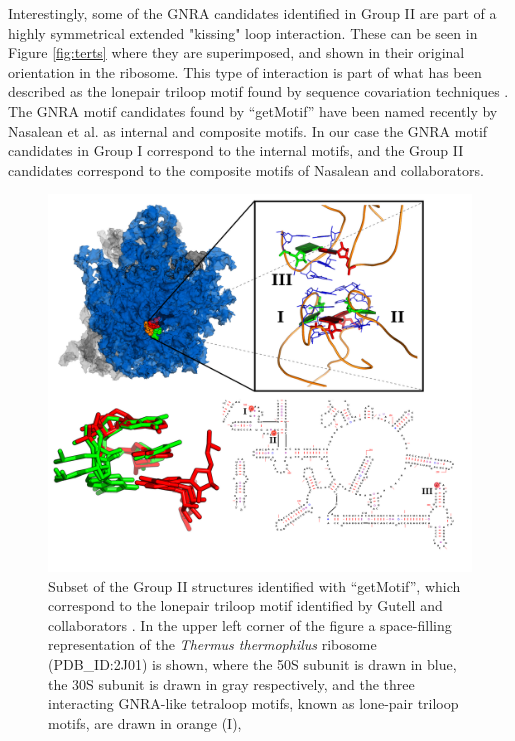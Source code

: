 Interestingly, some of  the GNRA candidates identified in  Group II are
part    of   a    highly   symmetrical    extended    "kissing"   loop
interaction. These  can be seen  in Figure \ref{fig:terts}  where they
are  superimposed, and  shown  in their  original  orientation in  the
ribosome. This type of interaction  is part of what has been described
as the lonepair triloop motif found by sequence covariation techniques
\cite{lee2003}.  The GNRA motif  candidates found by ``getMotif'' have
been named recently by Nasalean et al. \cite{nasalean2009} as internal
and composite motifs.  In our  case the GNRA motif candidates in Group
I  correspond to  the internal  motifs,  and the  Group II  candidates
correspond to the composite motifs of Nasalean and collaborators.

\begin{figure}
\centering 
\includegraphics[angle=0, scale=0.34]{Chapter5/lonepairtlooptertF.png}
\caption{Subset   of   the  Group   II   structures  identified   with
  ``getMotif'',  which  correspond   to  the  lonepair  triloop  motif
  identified by Gutell and collaborators \cite{lee2003}.  In the upper
  left  corner of  the figure  a space-filling  representation  of the
  \textit{Thermus  thermophilus}  ribosome  (PDB\_ID:2J01)  is  shown,
  where the 50S subunit is drawn  in blue, the 30S subunit is drawn in
  gray  respectively, and  the three  interacting  GNRA-like tetraloop
  motifs, known as lone-pair triloop  motifs, are drawn in orange (I),
}
\end{figure}
